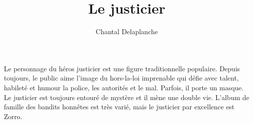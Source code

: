 \documentclass[a5paper,notitlepage]{article}
\author{Chantal Delaplanche}
\title{Le justicier}
\begin{document}
\maketitle
Le personnage du héros justicier est une figure traditionnelle populaire. Depuis toujours, le public aime l'image du
hors-la-loi imprenable qui défie avec talent, habileté et humour la police, les autorités et le mal. Parfois, il porte
un masque. Le justicier est toujours entouré de mystère et il mène une double vie. L'album de famille des bandits
honnêtes est très varié, mais le justicier par excellence est Zorro.
\end{document}
